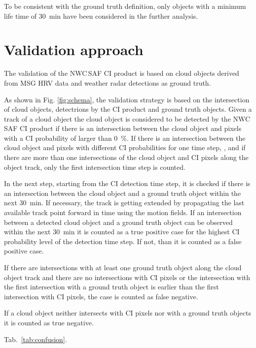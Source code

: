 To be consistent with the ground truth definition, only objects with a minimum life time of \SI{30}{\minute} have been considered in the further analysis.

\section{Validation approach}
\label{sec:validation}
The validation of the NWC\,SAF CI product  is based on cloud objects derived from MSG HRV data and weather radar detections as ground truth.

As shown in Fig. \ref{fig:schema}, the validation strategy is based on the intersection of cloud objects, detectrions by the CI product and ground truth objects. Given a track of a cloud object the cloud object is considered to be detected by the NWC\,SAF CI product if there is an intersection between the cloud object and pixels with a CI probability of  larger than \SI{0}{\percent}. If there is an intersection between the cloud object and pixels with different CI probabilities for one time step, , and if there are more than one intersections of the cloud object and CI pixels along the object track, only the first intersection time step is counted. 

In the next step, starting from the CI detection time step, it is checked if there is an intersection between the cloud object and a ground truth object within the next \SI{30}{\minute}. If necessary, the track is getting extended by propagating the last available track point forward in time using the motion fields. If an intersection between a detected cloud object and a ground truth object can be observed within the next \SI{30}{\minute} it is counted as a true positive case for the highest CI probability level of the detection time step. If not, than it is counted as a false positive case.

If there are intersections with at least one ground truth object along the cloud object track and there are no intersections with CI pixels or the intersection with the first intersection with a ground truth object is earlier than the first intersection with CI pixels, the case is counted as false negative.

If a cloud object neither intersects with CI pixels nor with a ground truth objects it is counted as true negative.

 Tab.~\ref{tab:confusion}.

